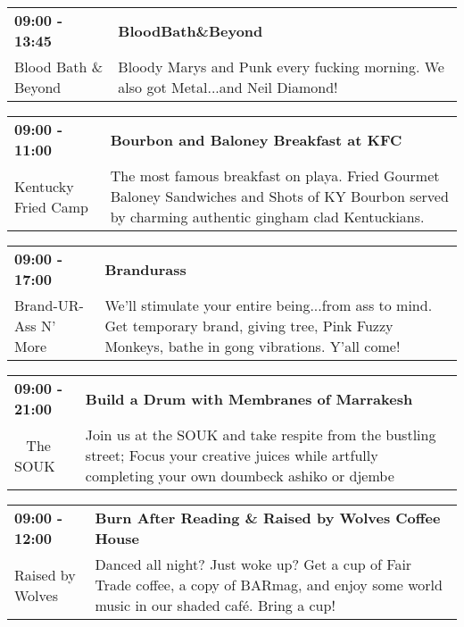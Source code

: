 \begin{tabular}{ p{1in} p{2.2in} }
    \textbf{09:00 - 13:45} & \textbf{BloodBath\&Beyond} \\
    Blood Bath \& Beyond \newline  & Bloody Marys and Punk every fucking morning. We also got Metal...and Neil Diamond! \\
    \hline 
\end{tabular}
    
\begin{tabular}{ p{1in} p{2.2in} }
    \textbf{09:00 - 11:00} & \textbf{Bourbon and Baloney Breakfast at KFC} \\
    Kentucky Fried Camp \newline  & The most famous breakfast on playa. Fried Gourmet Baloney Sandwiches and Shots of KY Bourbon served by charming authentic gingham clad Kentuckians. \\
    \hline 
\end{tabular}
    
\begin{tabular}{ p{1in} p{2.2in} }
    \textbf{09:00 - 17:00} & \textbf{Brandurass} \\
    Brand-UR-Ass N' More \newline  & We'll stimulate your entire being...from ass to mind. Get temporary brand, giving tree, Pink Fuzzy Monkeys, bathe in gong vibrations. Y'all come! \\
    \hline 
\end{tabular}
    
\begin{tabular}{ p{1in} p{2.2in} }
    \textbf{09:00 - 21:00} & \textbf{Build a Drum with Membranes of Marrakesh} \\
    ~ \newline The SOUK & Join us at the SOUK and take respite from the bustling street; Focus your creative juices while artfully completing your own doumbeck ashiko or djembe \\
    \hline 
\end{tabular}
    
\begin{tabular}{ p{1in} p{2.2in} }
    \textbf{09:00 - 12:00} & \textbf{Burn After Reading \& Raised by Wolves Coffee House} \\
    Raised by Wolves \newline  & Danced all night? Just woke up? Get a cup of Fair Trade coffee, a copy of BARmag, and enjoy some world music in our shaded caf\'e. Bring a cup! \\
    \hline 
\end{tabular}
    
